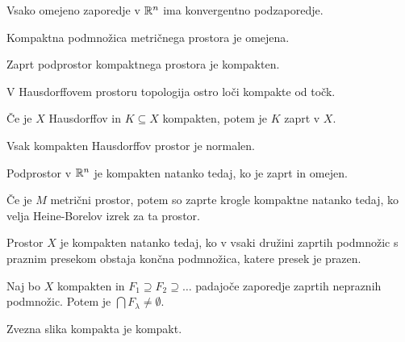 \begin{izrek}
    Vsako omejeno zaporedje v $\mathbb{R}^n$ ima konvergentno podzaporedje.
\end{izrek}

\begin{trditev}
    Kompaktna podmnožica metričnega prostora je omejena.
\end{trditev}

\begin{trditev}
    Zaprt podprostor kompaktnega prostora je kompakten.
\end{trditev}

\begin{trditev}
    V Hausdorffovem prostoru topologija ostro loči kompakte od točk.
\end{trditev}

\begin{trditev}
    Če je $X$ Hausdorffov in $K \subseteq X$ kompakten, potem je $K$ zaprt v $X$.
\end{trditev}

\begin{posledica}
    Vsak kompakten Hausdorffov prostor je normalen.
\end{posledica}

\begin{izrek}
    Podprostor v $\mathbb{R}^n$ je kompakten natanko tedaj, ko je zaprt in omejen.
\end{izrek}

\begin{opomba}
    Če je \(M\) metrični prostor, potem so zaprte krogle kompaktne natanko tedaj, ko velja Heine-Borelov izrek za ta prostor.
\end{opomba}

\begin{trditev}
    Prostor $X$ je kompakten natanko tedaj, ko v vsaki družini zaprtih podmnožic s praznim presekom obstaja končna podmnožica, katere presek je prazen.
\end{trditev}

\begin{izrek}
    Naj bo $X$ kompakten in $F_1 \supseteq F_2 \supseteq \ldots$ padajoče zaporedje zaprtih nepraznih podmnožic. Potem je $\bigcap F_\lambda \neq \emptyset$.
\end{izrek}

\begin{izrek}
    Zvezna slika kompakta je kompakt.
\end{izrek}

